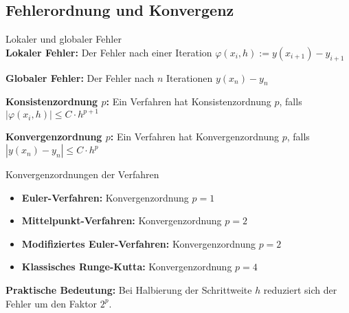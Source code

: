 \subsection{Fehlerordnung und Konvergenz}

\begin{definition}{Lokaler und globaler Fehler}\\
\textbf{Lokaler Fehler:} Der Fehler nach einer Iteration
$\varphi(x_i, h) := y(x_{i+1}) - y_{i+1}$

\textbf{Globaler Fehler:} Der Fehler nach $n$ Iterationen
$y(x_n) - y_n$

\textbf{Konsistenzordnung $p$:} Ein Verfahren hat Konsistenzordnung $p$, falls
$|\varphi(x_i, h)| \leq C \cdot h^{p+1}$

\textbf{Konvergenzordnung $p$:} Ein Verfahren hat Konvergenzordnung $p$, falls
$|y(x_n) - y_n| \leq C \cdot h^p$
\end{definition}

\begin{concept}{Konvergenzordnungen der Verfahren}
\begin{itemize}
    \item \textbf{Euler-Verfahren:} Konvergenzordnung $p = 1$
    \item \textbf{Mittelpunkt-Verfahren:} Konvergenzordnung $p = 2$
    \item \textbf{Modifiziertes Euler-Verfahren:} Konvergenzordnung $p = 2$
    \item \textbf{Klassisches Runge-Kutta:} Konvergenzordnung $p = 4$
\end{itemize}

\textbf{Praktische Bedeutung:} Bei Halbierung der Schrittweite $h$ reduziert sich der Fehler um den Faktor $2^p$.
\end{concept}

